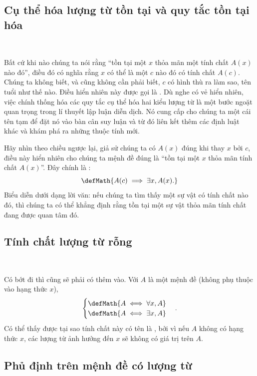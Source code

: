 \subsection{Cụ thể hóa lượng từ tồn tại và quy tắc tồn tại hóa}

\ 

Bất cứ khi nào chúng ta nói rằng ``tồn tại một $x$ thỏa mãn một tính chất $A(x)$ nào đó'', điều đó có nghĩa rằng $x$ có thể là một $c$ nào đó có tính chất $A(c)$. Chúng ta không biết, và cũng không cần phải biết, $c$ có hình thù ra làm sao, tên tuổi như thế nào. Điều hiển nhiên này được gọi là . Dù nghe có vẻ hiển nhiên, việc chính thống hóa các quy tắc cụ thể hóa hai kiểu lượng từ là một bước ngoặt quan trọng trong lí thuyết lập luận diễn dịch. Nó cung cấp cho chúng ta một cái tên tạm để đặt nó vào bàn cân suy luận và từ đó liên kết thêm các định luật khác và khám phá ra những thuộc tính mới.

Hãy nhìn theo chiều ngược lại, giả sử chúng ta có $A(x)$ đúng khi thay $x$ bởi $c$, điều này hiển nhiên cho chúng ta mệnh đề đúng là ``tồn tại một $x$ thỏa mãn tính chất $A(x)$''. Đây chính là :
\begin{equation*}
    \defMath{A(c) \implies \exists x, A(x).}
\end{equation*}
Biểu diễn dưới dạng lời văn: nếu chúng ta tìm thấy một sự vật có tính chất nào đó, thì chúng ta có thể khẳng định rằng tồn tại một sự vật thỏa mãn tính chất đang được quan tâm đó.

\subsection{Tính chất lượng từ rỗng}

\ 

Có bớt đi thì cũng sẽ phải có thêm vào. Với $A$ là một mệnh đề (không phụ thuộc vào hạng thức $x$),
\begin{equation*}
    \begin{cases}
        \defMath{A \iff \forall x, A} \\
        \defMath{A \iff \exists x, A}
    \end{cases}.
\end{equation*}
Có thể thấy được tại sao tính chất này có tên là , bởi vì nếu $A$ không có hạng thức $x$, các lượng từ ảnh hưởng đến $x$ sẽ không có giá trị trên $A$.

\subsection{Phủ định trên mệnh đề có lượng từ}

